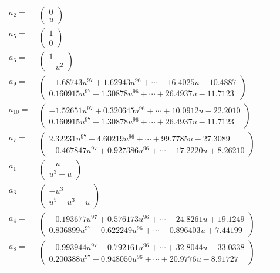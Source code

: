 \documentclass[1p]{elsarticle_modified}
\theoremstyle{definition}
\begin{document}
\begin{tabular}{m{7pt} m{180pt} m{7pt} m{180pt} }
\flushright $a_{2}=$&$\begin{pmatrix}0\\u\end{pmatrix}$ \\
\flushright $a_{5}=$&$\begin{pmatrix}1\\0\end{pmatrix}$ \\
\flushright $a_{6}=$&$\begin{pmatrix}1\\- u^2\end{pmatrix}$ \\
\flushright $a_{9}=$&$\begin{pmatrix}-1.68743 u^{97}+1.62943 u^{96}+\cdots-16.4025 u-10.4887\\0.160915 u^{97}-1.30878 u^{96}+\cdots+26.4937 u-11.7123\end{pmatrix}$ \\
\flushright $a_{10}=$&$\begin{pmatrix}-1.52651 u^{97}+0.320645 u^{96}+\cdots+10.0912 u-22.2010\\0.160915 u^{97}-1.30878 u^{96}+\cdots+26.4937 u-11.7123\end{pmatrix}$ \\
\flushright $a_{7}=$&$\begin{pmatrix}2.32231 u^{97}-4.60219 u^{96}+\cdots+99.7785 u-27.3089\\-0.467847 u^{97}+0.927386 u^{96}+\cdots-17.2220 u+8.26210\end{pmatrix}$ \\
\flushright $a_{1}=$&$\begin{pmatrix}- u\\u^3+u\end{pmatrix}$ \\
\flushright $a_{3}=$&$\begin{pmatrix}- u^3\\u^5+u^3+u\end{pmatrix}$ \\
\flushright $a_{4}=$&$\begin{pmatrix}-0.193677 u^{97}+0.576173 u^{96}+\cdots-24.8261 u+19.1249\\0.836899 u^{97}-0.622249 u^{96}+\cdots-0.896403 u+7.44199\end{pmatrix}$ \\
\flushright $a_{8}=$&$\begin{pmatrix}-0.993944 u^{97}-0.792161 u^{96}+\cdots+32.8044 u-33.0338\\0.200388 u^{97}-0.948050 u^{96}+\cdots+20.9776 u-8.91727\end{pmatrix}$ \\

\end{tabular}
\end{document}
